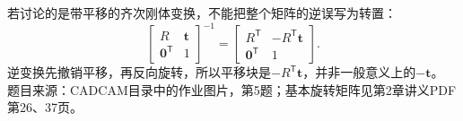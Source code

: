 若讨论的是带平移的齐次刚体变换，不能把整个矩阵的逆误写为转置：
\[
\boxed{\begin{bmatrix}R&\boldsymbol t\\\boldsymbol0^{\mathsf T}&1\end{bmatrix}^{-1}
=\begin{bmatrix}R^{\mathsf T}&-R^{\mathsf T}\boldsymbol t\\\boldsymbol0^{\mathsf T}&1\end{bmatrix}.}
\]
逆变换先撤销平移，再反向旋转，所以平移块是$-R^{\mathsf T}\boldsymbol t$，并非一般意义上的$-\boldsymbol t$。
{\footnotesize\color{mygr}题目来源：CADCAM目录中的作业图片，第5题；基本旋转矩阵见第2章讲义PDF第26、37页。}
